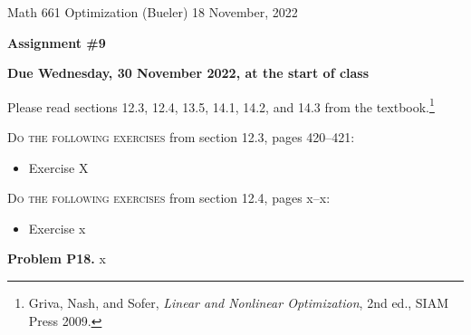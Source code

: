 \documentclass[12pt]{amsart}
\newcommand{\prob}[1]{\bigskip\noindent\textbf{#1}\quad }
\begin{document}
\scriptsize \noindent Math 661 Optimization (Bueler) \hfill 18 November, 2022
\normalsize

\medskip\bigskip

\Large\centerline{\textbf{Assignment \#9}}
\large
\bigskip

\centerline{\textbf{Due Wednesday, 30 November 2022, at the start of class}}
\bigskip
\normalsize

\thispagestyle{empty}

\bigskip
Please read sections 12.3, 12.4, 13.5, 14.1, 14.2, and 14.3 from the textbook.\footnote{Griva, Nash, and Sofer, \emph{Linear and Nonlinear Optimization}, 2nd ed., SIAM Press 2009.}

\bigskip
\noindent \textsc{Do the following exercises} from section 12.3, pages 420--421:

\begin{itemize}
\item Exercise X
\end{itemize}


\bigskip
\noindent \textsc{Do the following exercises} from section 12.4, pages x--x:

\begin{itemize}
\item Exercise x
\end{itemize}


\medskip
\prob{Problem P18.}  x
\end{document}
